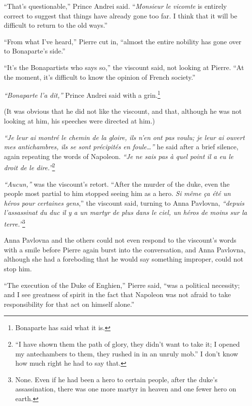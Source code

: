 ``That's questionable,'' Prince Andrei said. ``\textit{Monsieur le
  vicomte} is entirely correct to suggest that things have already
gone too far. I think that it will be difficult to return to the old
ways.''

``From what I've heard,'' Pierre cut in, ``almost the entire nobility
has gone over to Bonaparte's side.''

``It's the Bonapartists who says so,'' the viscount said, not looking
at Pierre. ``At the moment, it's difficult to know the opinion of
French society.''

\textit{``Bonaparte l'a dit,''} Prince Andrei said with a
grin.\footnote{Bonaparte has said what it is.}

(It was obvious that he did not like the viscount, and that, although
he was not looking at him, his speeches were directed at him.)

\textit{``Je leur ai montr\'e le chemin de la gloire, ils n'en ont pas
  voulu; je leur ai ouvert mes antichambres, ils se sont
  pr\'ecipit\'es en foule\ldots{}''} he said after a brief silence,
again repeating the words of Napoleon. \textit{``Je ne sais pas \`a
  quel point il a eu le droit de le dire.''}\footnote{``I have shown
  them the path of glory, they didn't want to take it; I opened my
  antechambers to them, they rushed in in an unruly mob.'' I don't
  know how much right he had to say that.}

\textit{``Aucun,''} was the viscount's retort. ``After the murder of
the duke, even the people most partial to him stopped seeing him as a
hero. \textit{Si m\^eme \c{c}a \'et\'e un h\'eros pour certaines
  gens},'' the viscount said, turning to Anna Pavlovna,
\textit{``depuis l'assassinat du duc il y a un martyr de plus dans le
  ciel, un h\'eros de moins sur la terre.''}\footnote{None. Even if he
  had been a hero to certain people, after the duke's assassination,
  there was one more martyr in heaven and one fewer hero on earth.}

Anna Pavlovna and the others could not even respond to the viscount's
words with a smile before Pierre again burst into the conversation,
and Anna Pavlovna, although she had a foreboding that he would say
something improper, could not stop him.

``The execution of the Duke of Enghien,'' Pierre said, ``was a
political necessity; and I see greatness of spirit in the fact that
Napoleon was not afraid to take responsibility for that act on himself
alone.''


